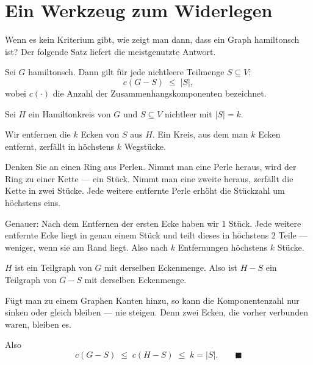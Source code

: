 \section{Ein Werkzeug zum Widerlegen}

Wenn es kein Kriterium gibt, wie zeigt man dann, dass ein Graph  hamiltonsch ist? Der folgende Satz liefert die meistgenutzte Antwort.

\begin{merksatz}
Sei $G$ hamiltonsch. Dann gilt für jede nichtleere Teilmenge $S \subseteq V$:
\[ c(G - S) \;\le\; |S| , \]
wobei $c(\cdot)$ die Anzahl der Zusammenhangskomponenten bezeichnet.
\end{merksatz}

\begin{merksatz}
Sei $H$ ein Hamiltonkreis von $G$ und $S \subseteq V$ nichtleer mit $|S| = k$.

Wir entfernen die $k$ Ecken von $S$ aus $H$. Ein Kreis, aus dem man $k$ Ecken entfernt, zerfällt in höchstens $k$ Wegstücke.

Denken Sie an einen Ring aus Perlen. Nimmt man eine Perle heraus, wird der Ring zu einer Kette --- ein Stück. Nimmt man eine zweite heraus, zerfällt die Kette in zwei Stücke. Jede weitere entfernte Perle erhöht die Stückzahl um höchstens eins.

Genauer: Nach dem Entfernen der ersten Ecke haben wir $1$ Stück. Jede weitere entfernte Ecke liegt in genau einem Stück und teilt dieses in höchstens $2$ Teile --- weniger, wenn sie am Rand liegt. Also nach $k$ Entfernungen höchstens $k$ Stücke.

\begin{center}
\end{center}

$H$ ist ein Teilgraph von $G$ mit derselben Eckenmenge. Also ist $H - S$ ein Teilgraph von $G - S$ mit derselben Eckenmenge.

Fügt man zu einem Graphen Kanten hinzu, so kann die Komponentenzahl nur sinken oder gleich bleiben --- nie steigen. Denn zwei Ecken, die vorher verbunden waren, bleiben es.

Also
\[ c(G-S) \;\le\; c(H-S) \;\le\; k = |S| . \qquad \blacksquare \]
\end{merksatz}

